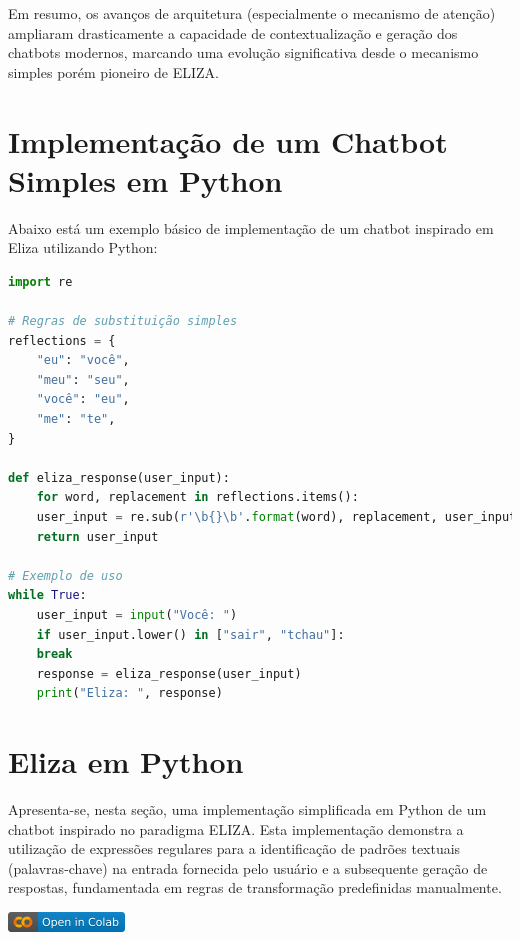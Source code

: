 \documentclass[14pt,a4paper,oneside]{book}
\begin{document}
Em resumo, os avanços de arquitetura (especialmente o mecanismo de atenção) ampliaram drasticamente a capacidade de contextualização e geração dos chatbots modernos, marcando uma evolução significativa desde o mecanismo simples porém pioneiro de ELIZA.

\section{Implementação de um Chatbot Simples em Python}

Abaixo está um exemplo básico de implementação de um chatbot inspirado em Eliza utilizando Python:

\begin{lstlisting}[language=Python]
import re

# Regras de substituição simples
reflections = {
	"eu": "você",
	"meu": "seu",
	"você": "eu",
	"me": "te",
}

def eliza_response(user_input):
	for word, replacement in reflections.items():
	user_input = re.sub(r'\b{}\b'.format(word), replacement, user_input)
	return user_input

# Exemplo de uso
while True:
	user_input = input("Você: ")
	if user_input.lower() in ["sair", "tchau"]:
	break
	response = eliza_response(user_input)
	print("Eliza: ", response)
\end{lstlisting}

\section{Eliza em Python}

Apresenta-se, nesta seção, uma implementação simplificada em Python de um chatbot inspirado no paradigma ELIZA. 
Esta implementação demonstra a utilização de expressões regulares para a identificação de padrões textuais (palavras-chave) na entrada fornecida pelo usuário e a subsequente geração de respostas, fundamentada em regras de transformação predefinidas manualmente.

\vspace{\baselineskip}
\href{https://colab.research.google.com/github/giseldo/chatbotbook/blob/main/notebook/eliza.ipynb}{
  \includegraphics{./fig/colab-badge.png}
}
\end{document}
